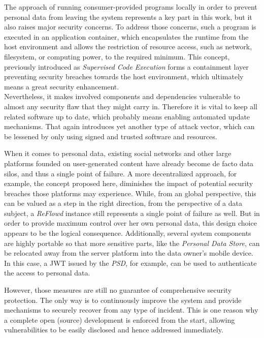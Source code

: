 \documentclass[12pt,english,a4paper,titlepage,cleardoublepage=empty,dottedtoc]{report}
\begin{document}
The approach of running consumer-provided programs locally in order to
prevent personal data from leaving the system represents a key part in
this work, but it also raises major security concerns. To address those
concerns, such a program is executed in an application container, which
encapsulates the runtime from the host environment and allows the
restriction of resource access, such as network, filesystem, or
computing power, to the required minimum. This concept, previously
introduced as \emph{Supervised Code Execution} forms a containment layer
preventing security breaches towards the host environment, which
ultimately means a great security enhancement.\\
Nevertheless, it makes involved components and dependencies vulnerable
to almost any security flaw that they might carry in. Therefore it is
vital to keep all related software up to date, which probably means
enabling automated update mechanisms. That again introduces yet another
type of attack vector, which can be lessened by only using signed and
trusted software and resources.

When it comes to personal data, existing social networks and other large
platforms founded on user-generated content have already become de facto
data silos, and thus a single point of failure. A more decentralized
approach, for example, the concept proposed here, diminishes the impact
of potential security breaches those platforms may experience. While,
from an global perspective, this can be valued as a step in the right
direction, from the perspective of a data subject, a \emph{ReFlowd}
instance still represents a single point of failure as well. But in
order to provide maximum control over her own personal data, this design
choice appears to be the logical consequence. Additionally, several
system components are highly portable so that more sensitive parts, like
the \emph{Personal Data Store}, can be relocated away from the server
platform into the data owner's mobile device. In this case, a JWT issued
by the \emph{PSD}, for example, can be used to authenticate the access
to personal data.

However, those measures are still no guarantee of comprehensive security
protection. The only way is to continuously improve the system and
provide mechanisms to securely recover from any type of incident. This
is one reason why a complete open (source) development is enforced from
the start, allowing vulnerabilities to be easily disclosed and hence
addressed immediately.
\end{document}
